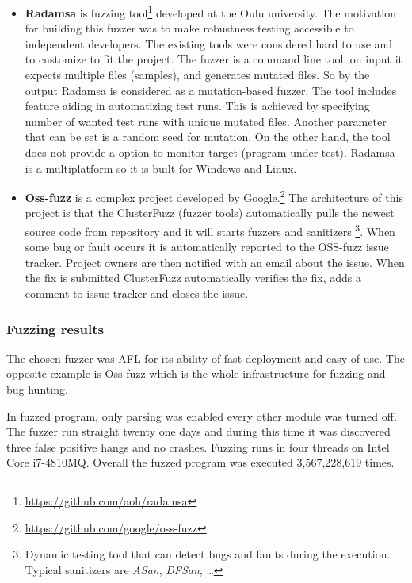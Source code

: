 \begin{itemize}
	\item \textbf{Radamsa} is fuzzing tool\footnote{\url{https://github.com/aoh/radamsa}} developed at the Oulu university.
	The motivation for building this fuzzer was to make robustness testing accessible to independent developers.
	The existing tools were considered hard to use and to customize to fit the project.
	The fuzzer is a command line tool, on input it expects multiple files (samples), and generates mutated files.
	So by the output Radamsa is considered as a mutation-based fuzzer.
	The tool includes feature aiding in automatizing test runs.
	This is achieved by specifying number of wanted test runs with unique mutated files.
	Another parameter that can be set is a random seed for mutation.
	On the other hand, the tool does not provide a option to monitor target (program under test).
	Radamsa is a multiplatform so it is built for Windows and Linux.\cite{radamsaThesis}

	\item \textbf{Oss-fuzz} is a complex project developed by Google.\footnote{\url{https://github.com/google/oss-fuzz}}
	The architecture of this project is that the ClusterFuzz (fuzzer tools)
	automatically pulls the newest source code from repository and it will starts
	fuzzers and sanitizers \footnote{Dynamic testing tool that can detect bugs and
	faults during the execution. Typical sanitizers are \textit{ASan},
	\textit{DFSan}, \ldots}. When some bug or fault occurs it is automatically
	reported to the OSS-fuzz issue tracker. Project owners are then notified with
	an email about the issue. When the fix is submitted ClusterFuzz automatically
	verifies the fix, adds a comment to issue tracker and closes the issue.

\end{itemize}


\subsubsection{Fuzzing results}
The chosen fuzzer was AFL for its ability of fast deployment and easy of use.
The opposite example is Oss-fuzz which is the whole infrastructure for fuzzing and bug hunting.

In fuzzed program, only parsing was enabled every other module was turned off.
The fuzzer run straight twenty one days and during this time it was discovered
three false positive hangs and no crashes. Fuzzing runs in four threads on Intel
Core i7-4810MQ. Overall the fuzzed program was executed 3,567,228,619 times.

